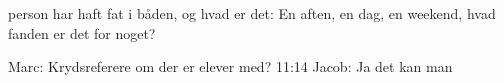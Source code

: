 person har haft fat i båden, og hvad er det: En aften, en dag, en weekend, hvad fanden er det for noget? 

Marc: Krydsreferere om der er elever med? 
11:14
Jacob: Ja det kan man 









